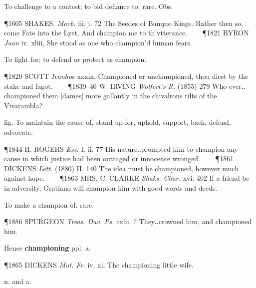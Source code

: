\begin{description}[wide, labelwidth=!, labelindent=0pt]
\noindent [f. prec. n.]
\vspace{-0.3cm}

\begin{myenumerate}

 To challenge to a contest; to bid defiance to. rare. Obs.

\P 1605 SHAKES.  \textit{Macb.} iii. i. 72 The Seedes of Banquo Kings. Rather then so, come Fate into the Lyst, And champion me to th'vtterance.    
\P 1821 BYRON  \textit{Juan} iv. xliii, She stood as one who champion'd human fears.

 To fight for; to defend or protect as champion.

\P 1820 SCOTT  \textit{Ivanhoe} xxxix, Championed or unchampioned, thou diest by the stake and fagot.    
\P 1839–40 W. IRVING \textit{Wolfert's R.} (1855) 279 Who ever‥championed them [dames] more gallantly in the chivalrous tilts of the Vivarambla?

 fig. To maintain the cause of, stand up for, uphold, support, back, defend, advocate.

\P 1844 H. ROGERS  \textit{Ess.} I. ii. 77 His nature‥prompted him to champion any cause in which justice had been outraged or innocence wronged.    
\P 1861 DICKENS  \textit{Lett.} (1880) II. 140 The idea must be championed, however much against hope.    
\P 1863 MRS. C. CLARKE  \textit{Shaks. Char.} xvi. 402 If a friend be in adversity, Gratiano will champion him with good words and deeds.

 To make a champion of. rare.

\P 1886 SPURGEON  \textit{Treas. Dav. Ps.} cxlii. 7 They‥crowned him, and championed him.

\noindent
Hence \textbf{championing} ppl. a.

\P 1865 DICKENS  \textit{Mut. Fr.} iv. xi, The championing little wife.
\end{myenumerate}


 n. and a.

\noindent {}

\noindent [a. F. charlatan ‘a mountebanke, a cousening drug-seller, a pratling quack-salver, a tatler, babler’ (Cotgr.), ad. It. ciarlatano = ciarlatore babbler, patterer, mountebank, f. ciarlare to babble, patter, act the mountebank, f. ciarla, chat, prattle; cf. Sp., Pg. charlar, Wallachian charrar, ONF. charer (Diez) to prattle, babble. Cf. quack to gabble like a duck, talk like a Cheap Jack, puff patent medicines, act as a charlatan.]
\vspace{-0.3cm}


\end{description}
